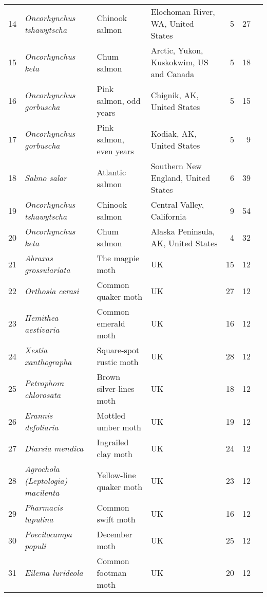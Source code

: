 \begin{table}[ht]
\begin{center}
{\begin{tabular}{rlllrrl}
   14 & \textit{Oncorhynchus tshawytscha} & Chinook salmon & Elochoman River, WA, United States &   5 &  27 & \citep{streamnet2011} \\ 
   15 & \textit{Oncorhynchus keta} & Chum salmon & Arctic, Yukon, Kuskokwim, US and Canada &   5 &  18 & \citep{dorner2008} \\ 
   16 & \textit{Oncorhynchus gorbuscha} & Pink salmon, odd years & Chignik, AK, United States &   5 &  15 & \citep{dorner2008} \\ 
   17 & \textit{Oncorhynchus gorbuscha} & Pink salmon, even years & Kodiak, AK, United States &   5 &   9 & \citep{dorner2008} \\ 
   18 & \textit{Salmo salar} & Atlantic salmon & Southern New England, United States &   6 &  39 & \citep{kocik2006} \\ 
   19 & \textit{Oncorhynchus tshawytscha} & Chinook salmon & Central Valley, California &   9 &  54 & \citep{carlson2011} \\ 
   20 & \textit{Oncorhynchus keta} & Chum salmon & Alaska Peninsula, AK, United States &   4 &  32 & \citep{dorner2008} \\ 
   21 & \textit{Abraxas grossulariata} & The magpie moth & UK &  15 &  12 & \citep{conrad2004} \\ 
   22 & \textit{Orthosia cerasi} & Common quaker moth & UK &  27 &  12 & \citep{conrad2004} \\ 
   23 & \textit{Hemithea aestivaria} & Common emerald moth & UK &  16 &  12 & \citep{conrad2004} \\ 
   24 & \textit{Xestia xanthographa} & Square-spot rustic moth & UK &  28 &  12 & \citep{conrad2004} \\ 
   25 & \textit{Petrophora chlorosata} & Brown silver-lines moth & UK &  18 &  12 & \citep{conrad2004} \\ 
   26 & \textit{Erannis defoliaria} & Mottled umber moth & UK &  19 &  12 & \citep{conrad2004} \\ 
   27 & \textit{Diarsia mendica} & Ingrailed clay moth & UK &  24 &  12 & \citep{conrad2004} \\ 
   28 & \textit{Agrochola (Leptologia) macilenta} & Yellow-line quaker moth & UK &  23 &  12 & \citep{conrad2004} \\ 
   29 & \textit{Pharmacis lupulina} & Common swift moth & UK &  16 &  12 & \citep{conrad2004} \\ 
   30 & \textit{Poecilocampa populi} & December moth & UK &  25 &  12 & \citep{conrad2004} \\ 
   31 & \textit{Eilema lurideola} & Common footman moth & UK &  20 &  12 & \citep{conrad2004} \\ 

\end{tabular}}
\end{center}
\end{table}

